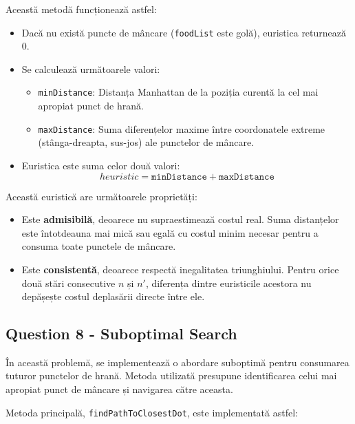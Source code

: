 \par Această metodă funcționează astfel:
\begin{itemize}
	\item Dacă nu există puncte de mâncare (\texttt{foodList} este golă), euristica returnează 0.
	\item Se calculează următoarele valori:
	\begin{itemize}
		\item \texttt{minDistance}: Distanța Manhattan de la poziția curentă la cel mai apropiat punct de hrană.
		\item \texttt{maxDistance}: Suma diferențelor maxime între coordonatele extreme (stânga-dreapta, sus-jos) ale punctelor de mâncare.
	\end{itemize}
	\item Euristica este suma celor două valori:
	\[
	heuristic = \texttt{minDistance} + \texttt{maxDistance}
	\]
\end{itemize}

\par Această euristică are următoarele proprietăți:
\begin{itemize}
	\item Este \textbf{admisibilă}, deoarece nu supraestimează costul real. Suma distanțelor este întotdeauna mai mică sau egală cu costul minim necesar pentru a consuma toate punctele de mâncare.
	\item Este \textbf{consistentă}, deoarece respectă inegalitatea triunghiului. Pentru orice două stări consecutive \( n \) și \( n' \), diferența dintre euristicile acestora nu depășește costul deplasării directe între ele.
\end{itemize}

\subsection{Question 8 - Suboptimal Search}
\par În această problemă, se implementează o abordare suboptimă pentru consumarea tuturor punctelor de hrană. Metoda utilizată presupune identificarea celui mai apropiat punct de mâncare și navigarea către aceasta.

\par Metoda principală, \texttt{findPathToClosestDot}, este implementată astfel:
\inputminted[linenos]{python}{code/suboptimal_search.py}

